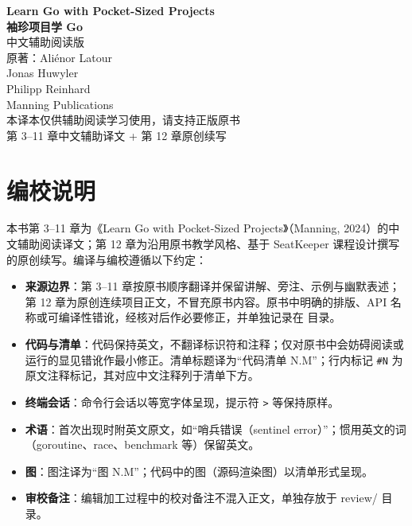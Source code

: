 \documentclass[11pt,openany]{book}
\begin{document}
\frontmatter
\begin{titlepage}
\centering
\vspace*{3cm}
{\Huge\bfseries Learn Go with Pocket-Sized Projects\\[0.8cm]
袖珍项目学 Go}\\[1.2cm]
{\Large 中文辅助阅读版}\\[2cm]
{\large 原著：Aliénor Latour\\
Jonas Huwyler\\
Philipp Reinhard}\\[1cm]
{\large Manning Publications}\\[3cm]
{\normalsize 本译本仅供辅助阅读学习使用，请支持正版原书}\\[0.5cm]
{\normalsize 第 3--11 章中文辅助译文 + 第 12 章原创续写}\\[2cm]
\vfill
\end{titlepage}

\chapter*{编校说明}

本书第 3--11 章为《Learn Go with Pocket-Sized Projects》（Manning, 2024）的中文辅助阅读译文；第 12 章为沿用原书教学风格、基于 SeatKeeper 课程设计撰写的原创续写。编译与编校遵循以下约定：

\begin{itemize}
  \item \textbf{来源边界}：第 3--11 章按原书顺序翻译并保留讲解、旁注、示例与幽默表述；第 12 章为原创连续项目正文，不冒充原书内容。原书中明确的排版、API 名称或可编译性错讹，经核对后作必要修正，并单独记录在  目录。
  \item \textbf{代码与清单}：代码保持英文，不翻译标识符和注释；仅对原书中会妨碍阅读或运行的显见错讹作最小修正。清单标题译为``代码清单 N.M''；行内标记 \texttt{\#N} 为原文注释标记，其对应中文注释列于清单下方。
  \item \textbf{终端会话}：命令行会话以等宽字体呈现，提示符 \texttt{>} 等保持原样。
  \item \textbf{术语}：首次出现时附英文原文，如``哨兵错误（sentinel error）''；惯用英文的词（goroutine、race、benchmark 等）保留英文。
  \item \textbf{图}：图注译为``图 N.M''；代码中的图（源码渲染图）以清单形式呈现。
  \item \textbf{审校备注}：编辑加工过程中的校对备注不混入正文，单独存放于 review/ 目录。
\end{itemize}

\tableofcontents
\mainmatter

\setcounter{page}{1}

\setcounter{chapter}{2}












\end{document}
